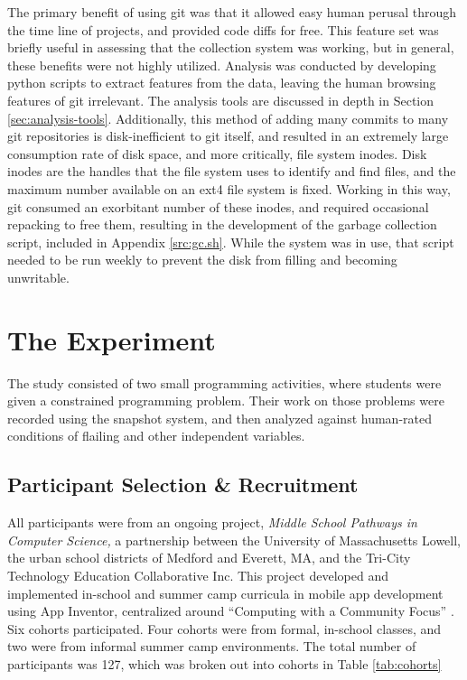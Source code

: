 The primary benefit of using git was that it allowed easy human perusal through the time line of projects, and provided code diffs for free. This feature set was briefly useful in assessing that the collection system was working, but in general, these benefits were not highly utilized. Analysis was conducted by developing python scripts to extract features from the data, leaving the human browsing features of git irrelevant. The analysis tools are discussed in depth in Section \ref{sec:analysis-tools}. Additionally, this method of adding many commits to many git repositories is disk-inefficient to git itself, and resulted in an extremely large consumption rate of disk space, and more critically, file system inodes. Disk inodes are the handles that the file system uses to identify and find files, and the maximum number available on an ext4 file system is fixed. Working in this way, git consumed an exorbitant number of these inodes, and required occasional repacking to free them, resulting in the development of the garbage collection script, included in Appendix \ref{src:gc.sh}. While the system was in use, that script needed to be run weekly to prevent the disk from filling and becoming unwritable. 


\section{The Experiment}

The study consisted of two small programming activities, where students were given a constrained programming problem. Their work on those problems were recorded using the snapshot system, and then analyzed against human-rated conditions of flailing and other independent variables.

\subsection{Participant Selection \& Recruitment} 

All participants were from an ongoing project, \emph{Middle School Pathways in Computer Science,} a partnership between the University of Massachusetts Lowell, the urban school districts of Medford and Everett, MA, and the Tri-City Technology Education Collaborative Inc. This project developed and implemented in-school and summer camp curricula in mobile app development using App Inventor, centralized around ``Computing with a Community Focus'' \citep{Ni-2016}. Six cohorts participated. Four cohorts were from formal, in-school classes, and two were from informal summer camp environments. The total number of participants was 127, which was broken out into cohorts in Table \ref{tab:cohorts}

